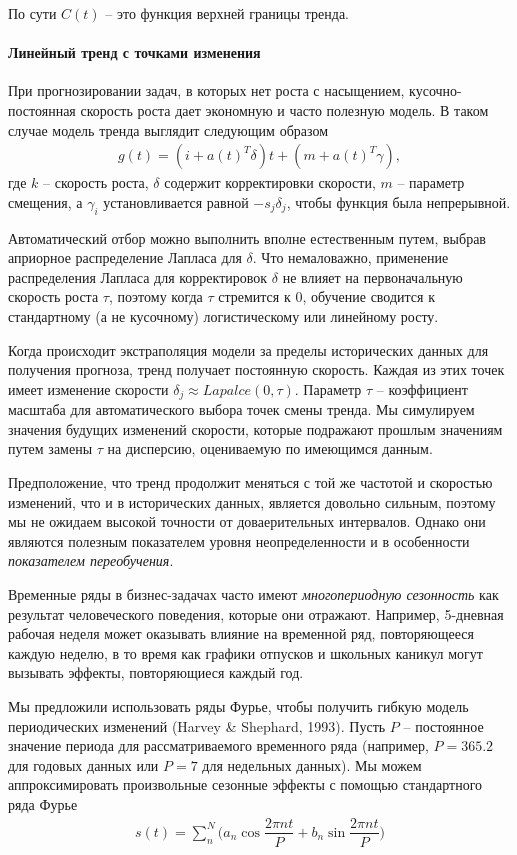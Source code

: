 \documentclass[%
	11pt,
	a4paper,
	utf8,
		]{article}
\begin{document}
По сути $C(t)$ -- это функция верхней границы тренда.

\paragraph{Линейный тренд с точками изменения}

При прогнозировании задач, в которых нет роста с насыщением, кусочно-постоянная скорость роста дает экономную и часто полезную модель. В таком случае модель тренда выглядит следующим образом
\begin{align*}
	g(t) = (i + a(t)^T \delta) t + (m + a(t)^T \gamma),
\end{align*}
где $k$ -- скорость роста, $\delta$ содержит корректировки скорости, $m$ -- параметр смещения, а $\gamma_i$ установливается равной $-s_j \delta_j$, чтобы функция была непрерывной.

Автоматический отбор можно выполнить вполне естественным путем, выбрав априорное распределение Лапласа для $\delta$. Что немаловажно, применение распределения Лапласа для корректировок $\delta$ не влияет на первоначальную скорость роста $\tau$, поэтому когда $\tau$ стремится к 0, обучение сводится к стандартному (а не кусочному) логистическому или линейному росту.

Когда происходит экстраполяция модели за пределы исторических данных для получения прогноза, тренд получает постоянную скорость. Каждая из этих точек имеет изменение скорости $\delta_j \approx Lapalce(0, \tau)$. Параметр $\tau$ -- коэффициент масштаба для автоматического выбора точек смены тренда. Мы симулируем значения будущих изменений скорости, которые подражают прошлым значениям путем замены $\tau$ на дисперсию, оцениваемую по имеющимся данным.

Предположение, что тренд продолжит меняться с той же частотой и скоростью изменений, что и в исторических данных, является довольно сильным, поэтому мы не ожидаем высокой точности от доваерительных интервалов. Однако они являются полезным показателем уровня неопределенности и в особенности \emph{показателем переобучения}.

Временные ряды в бизнес-задачах часто имеют \emph{многопериодную сезонность} как результат человеческого поведения, которые они отражают. Например, 5-дневная рабочая неделя может оказывать влияние на временной ряд, повторяющееся каждую неделю, в то время как графики отпусков и школьных каникул могут вызывать эффекты, повторяющиеся каждый год.

Мы предложили использовать ряды Фурье, чтобы получить гибкую модель  периодических изменений (Harvey \& Shephard, 1993). Пусть $P$ -- постоянное значение периода для рассматриваемого временного ряда (например, $P = 365.2$ для годовых данных или $P = 7$ для недельных данных). Мы можем аппроксимировать произвольные сезонные эффекты с помощью стандартного ряда Фурье
\begin{align*}
s(t) = \sum_{n}^{N} \Bigg( a_n \cos \dfrac{2 \pi n t}{P} + b_n \sin \dfrac{2 \pi n t}{P} \Bigg)
\end{align*} 
\end{document}

